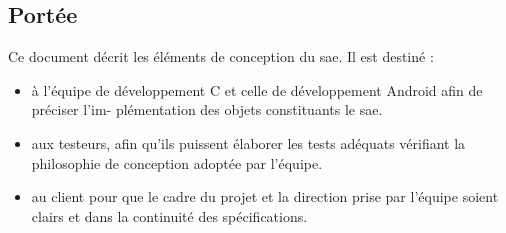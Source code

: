 \subsection{Portée} %

Ce document décrit les éléments de conception du \gls{sae}. Il est destiné :
\begin{itemize}
    \item à l’équipe de développement C et celle de développement Android afin de préciser l’im-
    plémentation des objets constituants le \gls{sae}.
    \item aux testeurs, afin qu’ils puissent élaborer les tests adéquats vérifiant la philosophie de
    conception adoptée par l’équipe.
    \item au client pour que le cadre du projet et la direction prise par l’équipe soient clairs et dans la continuité des spécifications.
\end{itemize}